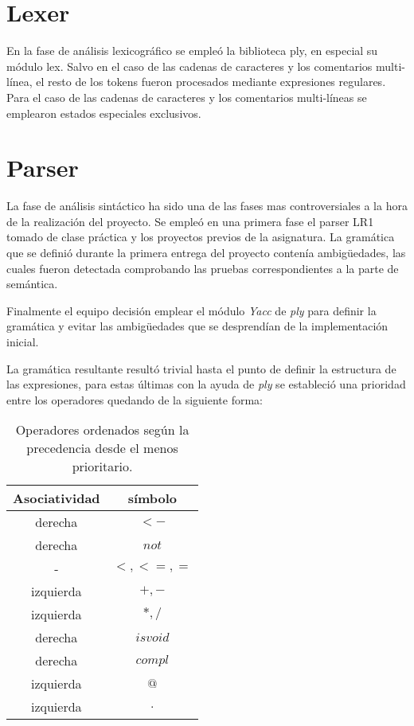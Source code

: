 \documentclass[a4paper,10pt,twocolumn]{article}
\begin{document}



\section{Lexer}\label{sec:dev}
	En la fase de análisis lexicográfico se empleó la biblioteca ply, en especial su módulo lex. 
	Salvo en el caso de las cadenas de caracteres y los comentarios multi-línea, el resto de los tokens fueron procesados mediante expresiones regulares. Para el caso de las cadenas de caracteres y los comentarios multi-líneas se emplearon estados especiales exclusivos. 
	
\section{Parser}
	La fase de análisis sintáctico ha sido una de las fases mas controversiales a la hora de la realización del proyecto. Se empleó en una primera fase el parser LR1 tomado de clase práctica y los proyectos previos de la asignatura. La gramática que se definió durante la primera entrega del proyecto contenía ambigüedades, las cuales fueron detectada comprobando las pruebas correspondientes a la parte de semántica. 
	
	Finalmente el equipo decisión emplear el módulo \textit{Yacc} de \textit{ply} para definir la gramática y evitar las ambigüedades que se desprendían de la implementación inicial.
	
	La gram\'atica resultante result\'o trivial hasta el punto de definir la estructura de las expresiones, para estas \'ultimas con la ayuda de \textit{ply} se estableci\'o una prioridad entre los operadores quedando de la siguiente forma:
	
	\begin{table}[h]
		\centering
		\begin{tabular}{|c|c|}
			\hline
			Asociatividad & s\'imbolo \\
			\hline
			derecha & $<-$\\
			\hline
			derecha & $not$\\
			\hline
			 - & $<,<=,=$ \\
			\hline
			izquierda & $+,-$\\
			\hline
			izquierda & $*,/$\\
			\hline
			derecha & $isvoid$\\
			\hline
			derecha & $compl$\\
			\hline
			izquierda & $@$\\
			\hline
			izquierda & $.$\\
			\hline
		\end{tabular}
		\caption{Operadores ordenados seg\'un la precedencia desde el menos prioritario.}
		
	\end{table}
	
\end{document}
